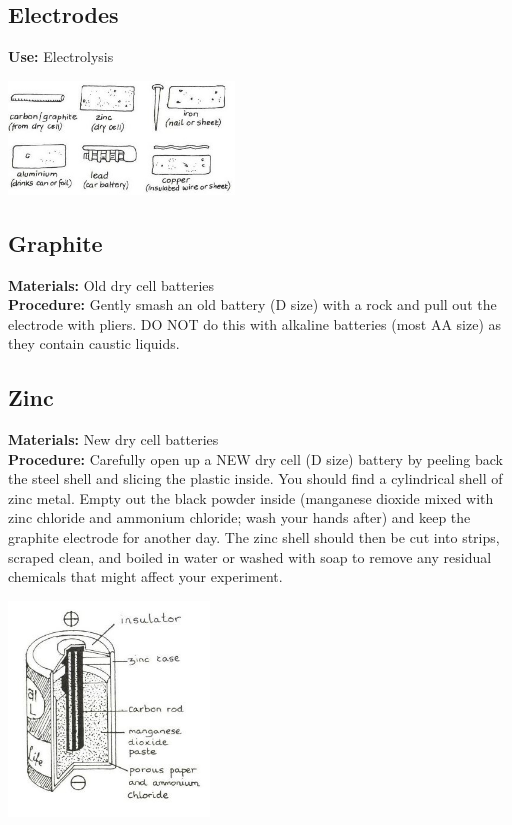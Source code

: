 \begin{multicols}{2}
\section{Electrodes} 
\label{sec:electrodes}
\vspace{-10pt}
\textbf{Use:} Electrolysis
\begin{center}
\includegraphics[width=0.45\textwidth]{./img/vso/electrodes.jpg}
\end{center}

\subsection{Graphite} 
\vspace{-6pt}
\textbf{Materials:} Old dry cell batteries\\
\textbf{Procedure:} Gently smash an old battery (D size) with a rock and pull out the electrode with pliers. DO NOT do this with alkaline batteries (most AA size) as they contain caustic liquids.
\subsection{Zinc} 
\vspace{-6pt}
\textbf{Materials:} New dry cell batteries\\
\textbf{Procedure:} Carefully open up a NEW dry cell (D size) battery by peeling back the steel shell and slicing the plastic inside. You should find a cylindrical shell of zinc metal. Empty out the black powder inside (manganese dioxide mixed with zinc chloride and ammonium chloride; wash your hands after) and keep the graphite electrode for another day. The zinc shell should then be cut into strips, scraped clean, and boiled in water or washed with soap to remove any residual chemicals that might affect your experiment.
\begin{center}
\includegraphics[width=0.4\textwidth]{./img/source/dry-cell.jpg}
\end{center}


\end{multicols}
